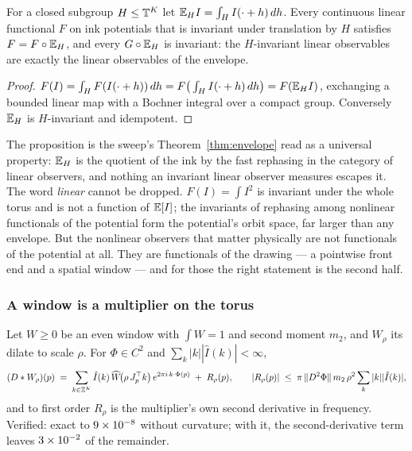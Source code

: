 \begin{proposition}
\label{prop:invariant}
For a closed subgroup $H\le\mathbb{T}^K$ let $\mathbb{E}_H I=\int_H I(\cdot+h)\,dh$. Every
continuous linear functional $F$ on ink potentials that is invariant under
translation by $H$ satisfies $F=F\circ\mathbb{E}_H$, and every $G\circ\mathbb{E}_H$ is
invariant: the $H$-invariant linear observables are exactly the linear
observables of the envelope.
\end{proposition}

\begin{proof}
$F(I)=\int_H F(I(\cdot+h))\,dh=F\big(\int_H I(\cdot+h)\,dh\big)=F(\mathbb{E}_HI)$,
exchanging a bounded linear map with a Bochner integral over a compact group.
Conversely $\mathbb{E}_H$ is $H$-invariant and idempotent.
\end{proof}

The proposition is the sweep's Theorem~\ref{thm:envelope} read as a
universal property: $\mathbb{E}_H$ is the quotient of the ink by the fast rephasing in
the category of linear observers, and nothing an invariant linear observer
measures escapes it. The word \emph{linear} cannot be dropped. $F(I)=\int I^2$
is invariant under the whole torus and is not a function of $\mathbb{E}[I]$; the
invariants of rephasing among nonlinear functionals of the potential form the
potential's orbit space, far larger than any envelope. But the nonlinear
observers that matter physically are not functionals of the potential at all.
They are functionals of the drawing --- a pointwise front end and a spatial
window --- and for those the right statement is the second half.

\subsubsection{A window is a multiplier on the torus}

\begin{theorem}
\label{thm:multiplier}
Let $W\ge0$ be an even window with $\int W=1$ and second moment $m_2$, and
$W_\rho$ its dilate to scale $\rho$. For $\Phi\in C^2$ and
$\sum_k|k||\hat I(k)|<\infty$,
\[
  (D*W_\rho)(p)\;=\;\sum_{k\in\mathbb{Z}^K}\hat I(k)\,\widehat W\!\big(\rho\,J_p^{\top}k\big)\,
  e^{2\pi i\,k\cdot\Phi(p)}\;+\;R_\rho(p),
  \qquad
  |R_\rho(p)|\;\le\;\pi\,\lVert D^2\Phi\rVert\,m_2\,\rho^2\sum_k|k||\hat I(k)|,
\]
and to first order $R_\rho$ is the multiplier's own second derivative in
frequency. Verified: exact to $9\times 10^{-8}$ without curvature; with it,
the second-derivative term leaves $3\times 10^{-2}$ of the remainder.
\end{theorem}

